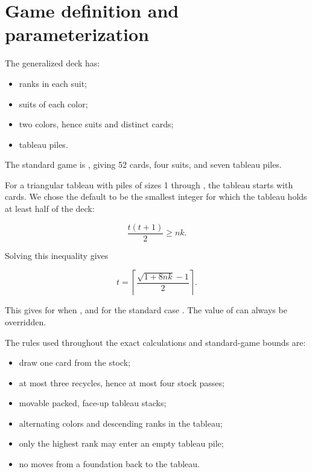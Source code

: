 \documentclass[11pt]{article}
\begin{document}
\section{Game definition and parameterization}

The generalized deck has:

\begin{itemize}
  \item \texttt{} ranks in each suit;
  \item \texttt{} suits of each color;
  \item two colors, hence \texttt{} suits and \texttt{} distinct cards;
  \item \texttt{} tableau piles.
\end{itemize}

The standard game is \texttt{}, giving 52 cards, four suits, and seven tableau piles.

For a triangular tableau with piles of sizes 1 through \texttt{}, the tableau starts with  cards. We chose the default \texttt{} to be the smallest integer for which the tableau holds at least half of the deck:

\[
\frac{t(t+1)}{2}\ge nk.
\]

Solving this inequality gives

\[
t=\left\lceil\frac{\sqrt{1+8nk}-1}{2}\right\rceil.
\]

This gives \texttt{} for \texttt{} when \texttt{}, and \texttt{} for the standard case \texttt{}. The value of \texttt{} can always be overridden.

The rules used throughout the exact calculations and standard-game bounds are:

\begin{itemize}
  \item draw one card from the stock;
  \item at most three recycles, hence at most four stock passes;
  \item movable packed, face-up tableau stacks;
  \item alternating colors and descending ranks in the tableau;
  \item only the highest rank may enter an empty tableau pile;
  \item no moves from a foundation back to the tableau.
\end{itemize}
\end{document}
